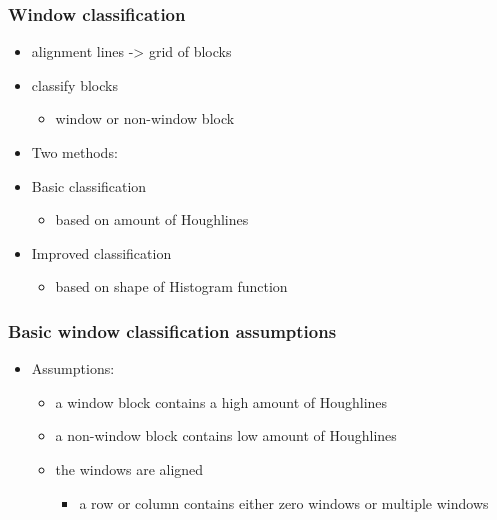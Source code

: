 \documentclass{beamer}
\begin{document}
\frame
{
}

\frame
{
}


\frame
{
	\frametitle{Window classification}
	\begin{itemize}
	\item <+-| alert@+> alignment lines -> grid of blocks
	\item <+-| alert@+> classify blocks 
		\begin{itemize}
		\item <+-| alert@+> window or non-window block
		\end{itemize}
	\item <+-| alert@+> Two methods:
	\item <+-| alert@+> Basic classification 
		\begin{itemize}
		\item <+-| alert@+> based on amount of Houghlines
		\end{itemize}
	\item <+-| alert@+> Improved classification 
		\begin{itemize}
		\item <+-| alert@+> based on shape of Histogram function
		\end{itemize}
	\end{itemize}
}

\frame
{
	\frametitle{Basic window classification assumptions}
	\begin{itemize}
	\item <+-| alert@+> Assumptions:
		\begin{itemize}
		\item <+-| alert@+> a window block contains a high amount of Houghlines
		\item <+-| alert@+> a non-window block contains low amount of Houghlines
		\item <+-| alert@+> the windows are aligned 
			\begin{itemize}
			\item <+-| alert@+> a row or column contains either zero windows or multiple windows 
			\end{itemize}
		\end{itemize}
	\end{itemize}
}
\end{document}
